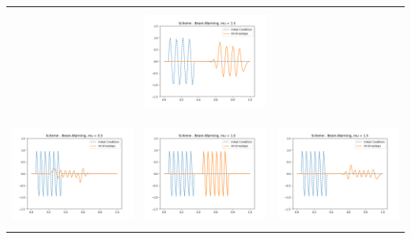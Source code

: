 \documentclass[a4paper,twoside,11pt]{article}
\begin{document}
\begin{table}[!h]
\begin{tabular}{ | c | m{5cm} | m{5cm} | }
            &
            \begin{minipage}{.3\textwidth}
              \includegraphics[width=\linewidth, height=3.5cm]{../plots/scheme5-IC3-mu1_5.png}
            \end{minipage} \\
            \begin{minipage}{.3\textwidth}
              \includegraphics[width=\linewidth, height=3.5cm]{../plots/scheme5-IC4-mu0_5.png}
            \end{minipage}
            &
            \begin{minipage}{.3\textwidth}
              \includegraphics[width=\linewidth, height=3.5cm]{../plots/scheme5-IC4-mu1_0.png}
            \end{minipage}
            &
            \begin{minipage}{.3\textwidth}
              \includegraphics[width=\linewidth, height=3.5cm]{../plots/scheme5-IC4-mu1_5.png}
            \end{minipage} \\

\end{tabular}
\end{table}
\end{document}
